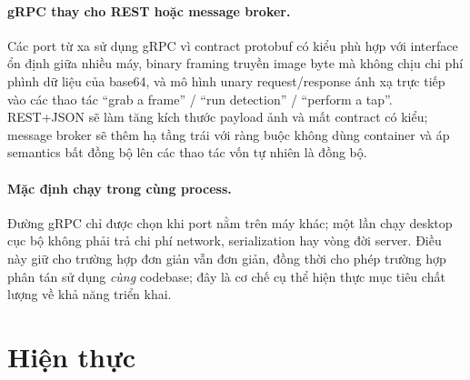 \documentclass[11pt,a4paper]{article}
\begin{document}
\paragraph{gRPC thay cho REST hoặc message broker.} Các port từ xa sử dụng gRPC vì
contract protobuf có kiểu phù hợp với interface ổn định giữa nhiều máy, binary
framing truyền image byte mà không chịu chi phí phình dữ liệu của base64, và mô hình
unary request/response ánh xạ trực tiếp vào các thao tác ``grab a frame'' / ``run
detection'' / ``perform a tap''. REST+JSON sẽ làm tăng kích thước payload ảnh và
mất contract có kiểu; message broker sẽ thêm hạ tầng trái với ràng buộc không dùng
container và áp semantics bất đồng bộ lên các thao tác vốn tự nhiên là đồng bộ.

\paragraph{Mặc định chạy trong cùng process.} Đường gRPC chỉ được chọn khi port nằm
trên máy khác; một lần chạy desktop cục bộ không phải trả chi phí network,
serialization hay vòng đời server. Điều này giữ cho trường hợp đơn giản vẫn đơn
giản, đồng thời cho phép trường hợp phân tán sử dụng \emph{cùng} codebase; đây là cơ
chế cụ thể hiện thực mục tiêu chất lượng về khả năng triển khai.

\section{Hiện thực}
\label{sec:impl}
\end{document}
